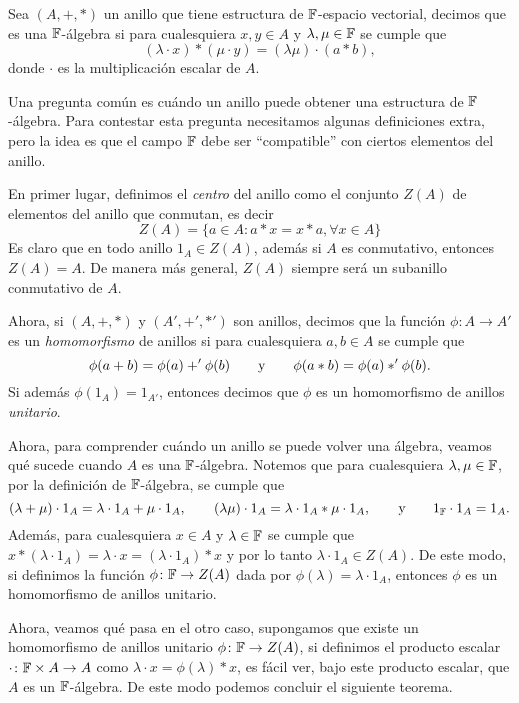 \begin{defi}
  Sea $(A,+,*)$ un anillo que tiene estructura de $\mathbb{F}$-espacio vectorial, decimos que es una $\mathbb{F}$-álgebra si para cualesquiera $x, y \in A$ y $\lambda, \mu \in \mathbb{F}$ se cumple que
    \[ (\lambda \cdot x) *  (\mu \cdot y) = (\lambda \mu) \cdot (a * b), \]
  donde $\cdot$ es la multiplicación escalar de $A$.
\end{defi}

Una pregunta común es cuándo un anillo puede obtener una estructura de $\mathbb{F}$-álgebra. Para contestar esta pregunta necesitamos algunas definiciones extra, pero la idea es que el campo $\mathbb{F}$ debe ser ``compatible'' con ciertos elementos del anillo.

En primer lugar, definimos el \emph{centro} del anillo como el conjunto $Z(A)$ de elementos del anillo que conmutan, es decir
  \[
    Z(A) = \{a \in A : a*x = x*a, \forall x \in A \}
  \]
Es claro que en todo anillo $1_A \in Z(A)$, además si $A$ es conmutativo, entonces $Z(A) = A$. De manera más general, $Z(A)$ siempre será un subanillo conmutativo de $A$.

Ahora, si $(A, +, *)$ y $(A', +', *')$ son anillos, decimos que la función $\phi\colon A \to A'$ es un \emph{homomorfismo} de anillos si para cualesquiera $a,b \in A$ se cumple que 
\[ \phi(a+b) = \phi(a) +' \phi(b)  \qquad\text{y}\qquad  \phi(a*b) = \phi(a) *' \phi(b). \]
Si además $\phi(1_A) = 1_{A'}$, entonces decimos que $\phi$ es un homomorfismo de anillos \emph{unitario}.

Ahora, para comprender cuándo un anillo se puede volver una álgebra, veamos qué sucede cuando $A$ es una $\mathbb{F}$-álgebra. Notemos que para cualesquiera $\lambda, \mu \in \mathbb{F}$, por la definición de $\mathbb{F}$-álgebra, se cumple que
  \[
    (\lambda +\mu) \cdot 1_A = \lambda \cdot 1_A + \mu \cdot 1_A,
      \qquad 
    (\lambda \mu) \cdot 1_A = \lambda \cdot 1_A * \mu \cdot 1_A,
      \qquad\text{y}\qquad
    1_{\mathbb{F}} \cdot 1_A = 1_A.
  \]
Además, para cualesquiera $x \in A$ y $\lambda \in \mathbb{F}$ se cumple que $x * (\lambda \cdot 1_A) = \lambda \cdot x = (\lambda \cdot 1_A) * x$ y por lo tanto $\lambda \cdot 1_A \in Z(A)$. De este modo, si definimos la función $\phi\colon \mathbb{F}\to Z(A)$ dada por $\phi(\lambda) = \lambda \cdot 1_A$, entonces $\phi$ es un homomorfismo de anillos unitario.

Ahora, veamos qué pasa en el otro caso, supongamos que existe un homomorfismo de anillos unitario $\phi\colon \mathbb{F} \to Z(A)$, si definimos el producto escalar $\cdot \colon \mathbb{F}\times A \to A$ como $\lambda \cdot x = \phi(\lambda) * x$, es fácil ver, bajo este producto escalar, que $A$ es un $\mathbb{F}$-álgebra. De este modo podemos concluir el siguiente teorema.

